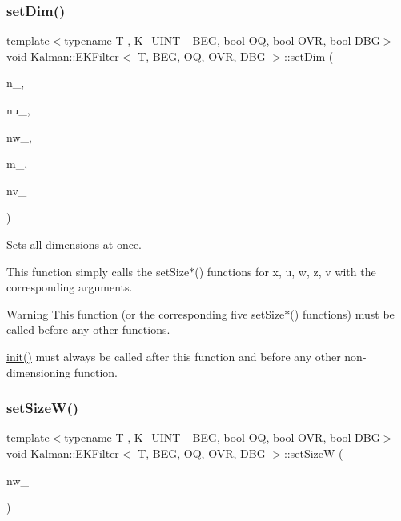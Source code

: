 \subsubsection{\texorpdfstring{set\+Dim()}{setDim()}}
{\footnotesize\ttfamily template$<$typename T , K\+\_\+\+U\+I\+N\+T\+\_ B\+EG, bool OQ, bool O\+VR, bool D\+BG$>$ \\
void \mbox{\hyperlink{classKalman_1_1EKFilter}{Kalman\+::\+E\+K\+Filter}}$<$ T, B\+EG, OQ, O\+VR, D\+BG $>$\+::set\+Dim (\begin{DoxyParamCaption}\item[{\mbox{\hyperlink{namespaceKalman_a628a50cae10f6e2035393d4f96c698bd}{K\+\_\+\+U\+I\+N\+T\+\_\+32}}}]{n\+\_\+,  }\item[{\mbox{\hyperlink{namespaceKalman_a628a50cae10f6e2035393d4f96c698bd}{K\+\_\+\+U\+I\+N\+T\+\_\+32}}}]{nu\+\_\+,  }\item[{\mbox{\hyperlink{namespaceKalman_a628a50cae10f6e2035393d4f96c698bd}{K\+\_\+\+U\+I\+N\+T\+\_\+32}}}]{nw\+\_\+,  }\item[{\mbox{\hyperlink{namespaceKalman_a628a50cae10f6e2035393d4f96c698bd}{K\+\_\+\+U\+I\+N\+T\+\_\+32}}}]{m\+\_\+,  }\item[{\mbox{\hyperlink{namespaceKalman_a628a50cae10f6e2035393d4f96c698bd}{K\+\_\+\+U\+I\+N\+T\+\_\+32}}}]{nv\+\_\+ }\end{DoxyParamCaption})}



Sets all dimensions at once. 

This function simply calls the {\ttfamily set\+Size$\ast$}() functions for {\ttfamily x, u, w, z, v} with the corresponding arguments. \begin{DoxyWarning}{Warning}
This function (or the corresponding five {\ttfamily set\+Size$\ast$}() functions) must be called before any other functions. 

{\ttfamily \mbox{\hyperlink{classKalman_1_1EKFilter_a80d5dc8f46e8f5d4ec3a6b1e804fdc9f}{init()}}} must always be called after this function and before any other non-\/dimensioning function. 
\end{DoxyWarning}
\mbox{\label{classKalman_1_1EKFilter_a6518bb07784ffd30edc70750ec0459f1}} 
\subsubsection{\texorpdfstring{set\+Size\+W()}{setSizeW()}}
{\footnotesize\ttfamily template$<$typename T , K\+\_\+\+U\+I\+N\+T\+\_ B\+EG, bool OQ, bool O\+VR, bool D\+BG$>$ \\
void \mbox{\hyperlink{classKalman_1_1EKFilter}{Kalman\+::\+E\+K\+Filter}}$<$ T, B\+EG, OQ, O\+VR, D\+BG $>$\+::set\+SizeW (\begin{DoxyParamCaption}\item[{\mbox{\hyperlink{namespaceKalman_a628a50cae10f6e2035393d4f96c698bd}{K\+\_\+\+U\+I\+N\+T\+\_\+32}}}]{nw\+\_\+ }\end{DoxyParamCaption})}




